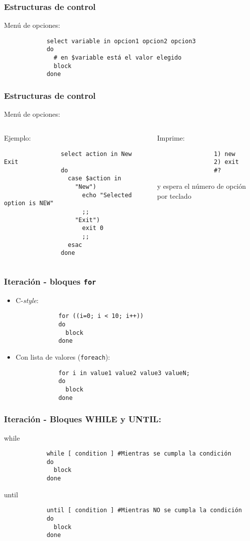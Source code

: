 \begin{frame}[fragile]
	\frametitle{Estructuras de control}
	\begin{block}{Menú de opciones:}
		\begin{lstlisting}
			select variable in opcion1 opcion2 opcion3
			do
			  # en $variable está el valor elegido
			  block
			done
		\end{lstlisting}
	\end{block}
\end{frame}
\begin{frame}[fragile]
	\frametitle{Estructuras de control}
	\begin{block}{Menú de opciones:}
	\begin{columns}
		\begin{column}{.50\linewidth}
			Ejemplo:
			\begin{lstlisting}
				select action in New Exit
				do
				  case $action in
				    "New")‏
				      echo "Selected option is NEW" 
				      ;;
				    "Exit")‏
				      exit 0
				      ;;
				  esac
				done
			\end{lstlisting}
		\end{column}
		\begin{column}{.45\linewidth}
			Imprime:
			\begin{Verbatim}
				1) new
				2) exit
				#?
			\end{Verbatim}
			y espera el número de opción por teclado
		\end{column}
	\end{columns}
	\end{block}
\end{frame}
\begin{frame}[fragile]
	\frametitle{Iteración - bloques \texttt{for}}
	\begin{itemize}
		\item C-\textit{style}:
		\begin{lstlisting}
			for ((i=0; i < 10; i++))
			do
			  block
			done
		\end{lstlisting}
		\item Con lista de valores (\texttt{foreach}):
		\begin{lstlisting}
			for i in value1 value2 value3 valueN;
			do
			  block
			done
		\end{lstlisting}
	\end{itemize}
\end{frame}
\begin{frame}[fragile]
	\frametitle{Iteración - Bloques WHILE y UNTIL:}
	\begin{block}{while}
		\begin{lstlisting}
			while [ condition ] #Mientras se cumpla la condición
			do
			  block
			done
		\end{lstlisting}
	\end{block}
	\begin{block}{until}
		\begin{lstlisting}
			until [ condition ] #Mientras NO se cumpla la condición 
			do
			  block
			done
		\end{lstlisting}
	\end{block}
\end{frame}
